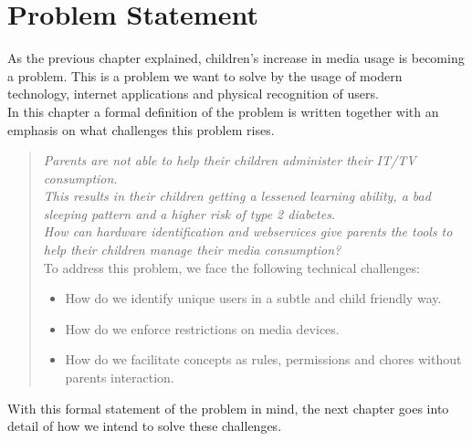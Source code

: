 \chapter{Problem Statement}
As the previous chapter explained, children's increase in media usage is becoming a problem. This is a problem we want to solve by the usage of modern technology, internet applications and physical recognition of users.\\
In this chapter a formal definition of the problem is written together with an emphasis on what challenges this problem rises.\\


\begin{verse}
\textit{Parents are not able to help their children administer their IT/TV consumption.\\
This results in their children getting a lessened learning ability, a bad sleeping pattern and a higher risk of type 2 diabetes.\\
How can hardware identification and webservices give parents the tools to help their children manage their media consumption?}\\
To address this problem, we face the following technical challenges:
	\begin{itemize}
		\item How do we identify unique users in a subtle and child friendly way.
		\item How do we enforce restrictions on media devices.
		\item How do we facilitate concepts as rules, permissions and chores without parents interaction.
	\end{itemize}
\end{verse}


With this formal statement of the problem in mind, the next chapter goes into detail of how we intend to solve these challenges.


